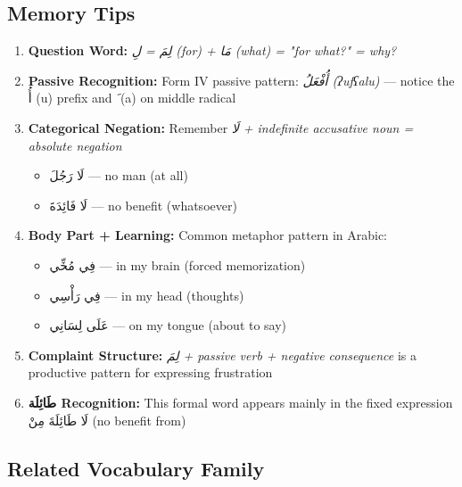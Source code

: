 \documentclass[letterpaper,12pt]{article}
\begin{document}
\subsection{Memory Tips}
\begin{enumerate}
\item \textbf{Question Word:} \textit{\textarabic{لِمَ} = \textarabic{لِ} (for) + \textarabic{مَا} (what) = "for what?" = why?}

\item \textbf{Passive Recognition:} Form IV passive pattern: \textit{\textarabic{أُفْعَلُ} (ʔufʕalu)} — notice the \textarabic{أُ} (u) prefix and \textarabic{َ} (a) on middle radical

\item \textbf{Categorical Negation:} Remember \textit{\textarabic{لَا} + indefinite accusative noun = absolute negation}
   \begin{itemize}
   \item \textarabic{لَا رَجُلَ} — no man (at all)
   \item \textarabic{لَا فَائِدَةَ} — no benefit (whatsoever)
   \end{itemize}

\item \textbf{Body Part + Learning:} Common metaphor pattern in Arabic:
   \begin{itemize}
   \item \textarabic{فِي مُخِّي} — in my brain (forced memorization)
   \item \textarabic{فِي رَأْسِي} — in my head (thoughts)
   \item \textarabic{عَلَى لِسَانِي} — on my tongue (about to say)
   \end{itemize}

\item \textbf{Complaint Structure:} \textit{\textarabic{لِمَ} + passive verb + negative consequence} is a productive pattern for expressing frustration

\item \textbf{\textarabic{طَائِلَة} Recognition:} This formal word appears mainly in the fixed expression \textarabic{لَا طَائِلَةَ مِنْ} (no benefit from)
\end{enumerate}

\subsection{Related Vocabulary Family}
\end{document}
